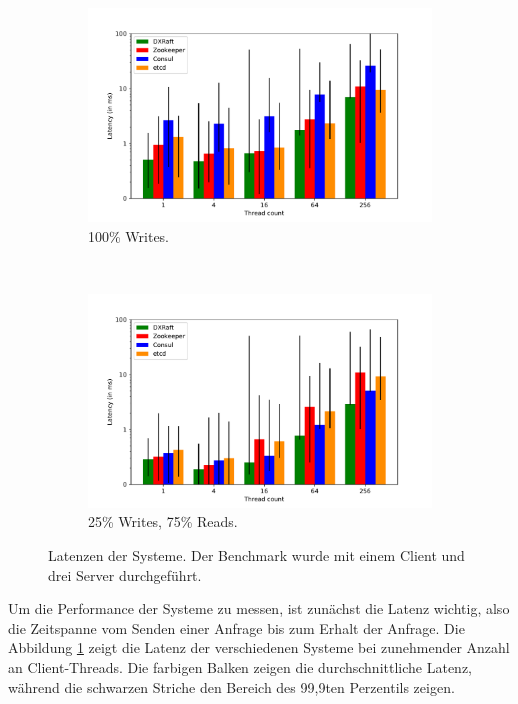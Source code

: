 \begin{figure}[p]
	\centering
	\begin{subfigure}[t]{0.8\textwidth}
		\includegraphics[width=\textwidth]{img/latency.pdf}
		\caption{100\% Writes.}
	\end{subfigure}\\
	\begin{subfigure}[t]{0.8\textwidth}
		\includegraphics[width=\textwidth]{img/latency2.pdf}
		\caption{25\% Writes, 75\% Reads.}
	\end{subfigure}
	\caption{Latenzen der Systeme. Der Benchmark wurde mit einem Client und drei Server durchgeführt.}
	\label{fig:latency}
\end{figure}

Um die Performance der Systeme zu messen, ist zunächst die Latenz wichtig, also die Zeitspanne vom Senden einer Anfrage bis zum Erhalt der Anfrage. Die Abbildung \ref{fig:latency} zeigt die Latenz der verschiedenen Systeme bei zunehmender Anzahl an Client-Threads. Die farbigen Balken zeigen die durchschnittliche Latenz, während die schwarzen Striche den Bereich des 99,9ten Perzentils zeigen. 


